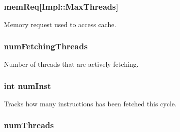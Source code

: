 \label{classDefaultFetch_a1f84ef3ef8e6b11f3bb9a3a0a6224345}
\hypertarget{classDefaultFetch_a7b85bc06912a7000a9b27cab60626a7a}{
\subsubsection[{memReq}]{ {\bf memReq}\mbox{[}Impl::MaxThreads\mbox{]}}}
\label{classDefaultFetch_a7b85bc06912a7000a9b27cab60626a7a}
Memory request used to access cache. \hypertarget{classDefaultFetch_a6f81783998429ac4a3e8b75a5d5d12d4}{
\subsubsection[{numFetchingThreads}]{ {\bf numFetchingThreads}}}
\label{classDefaultFetch_a6f81783998429ac4a3e8b75a5d5d12d4}
Number of threads that are actively fetching. \hypertarget{classDefaultFetch_a07c4afd8e6b9ff4bdf20b573a39d1372}{
\subsubsection[{numInst}]{\setlength{\rightskip}{0pt plus 5cm}int {\bf numInst}}}
\label{classDefaultFetch_a07c4afd8e6b9ff4bdf20b573a39d1372}
Tracks how many instructions has been fetched this cycle. \hypertarget{classDefaultFetch_a88377f855dbf5adeeecb06b5bb821d35}{
\subsubsection[{numThreads}]{ {\bf numThreads}}}
\label{classDefaultFetch_a88377f855dbf5adeeecb06b5bb821d35}
